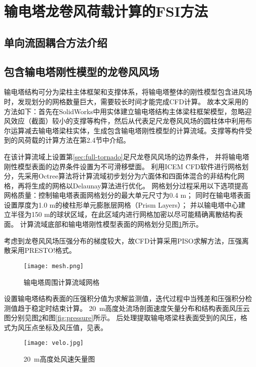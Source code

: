 \section{输电塔龙卷风荷载计算的FSI方法}

\subsection{单向流固耦合方法介绍}

\subsection{包含输电塔刚性模型的龙卷风风场}\label{sec:tornado-fsi}
输电塔结构可分为梁柱主体框架和支撑体系，将输电塔整体的刚性模型包含进风场时，发现划分的网格数量巨大，需要较长时间才能完成CFD计算。
故本文采用的方法如下：首先在SolidWorks中用实体建立输电塔结构主体梁柱框架模型，忽略迎风效应（截面）较小的支撑等构件，然后从代表足尺龙卷风风场的圆柱体中利用布尔运算减去输电塔梁柱实体，生成包含输电塔刚性模型的计算流域。支撑等构件受到的风荷载的计算方法在第2.4节中介绍。

在该计算流域上设置第\ref{sec:full-tornado}足尺龙卷风风场的边界条件，
并将输电塔刚性模型表面的边界条件设置为不可滑移壁面。
利用ICEM CFD软件进行网格划分，先采用Octree算法将计算流域初步划分为六面体和四面体混合的非结构化网格，再将生成的网格以Delaunay算法进行优化。
网格划分过程采用以下选项提高网格质量：控制输电塔表面网格划分的最大单元尺寸为0.4 m；
同时在输电塔表面设置厚度为1.0 m的棱柱形单元膨胀层网格（Prism Layers）；
并以输电塔中心建立半径为150 m的球状区域，在此区域内进行网格加密以尽可能精确离散结构表面。
计算流域底部和输电塔刚性模型表面的网格划分见图\ref{fig:mesh}所示。

考虑到龙卷风风场压强分布的梯度较大，故CFD计算采用PISO求解方法，压强离散采用PRESTO!格式\cite{fluent2015user}。

\begin{figure}[!htpb]
	\centering
	\texttt{[image: mesh.png]}
	\caption{输电塔周围计算流域网格}
	\label{fig:mesh}
\end{figure}

设置输电塔结构表面的压强积分值为求解监测值，迭代过程中当残差和压强积分检测值趋于稳定时结束计算。
\SI{20}{m}高度处流场剖面速度矢量分布和结构表面风压云图分别见图\ref{fig:velocity}和图\ref{fig:pressure}所示。
后处理提取输电塔梁柱表面受到的风压，格式为风压点坐标及风压值，见表。

\begin{figure}[!htpb]
	\centering
	\texttt{[image: velo.jpg]}
	\caption{\SI{20}{m}高度处风速矢量图}
	\label{fig:velocity}
\end{figure}

